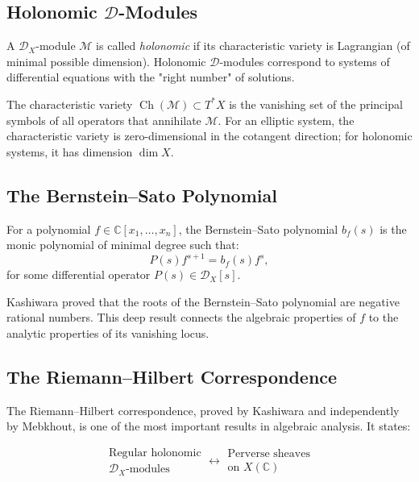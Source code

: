 \subsection{Holonomic $\mathcal{D}$-Modules}

A $\mathcal{D}_X$-module $\mathcal{M}$ is called \emph{holonomic} if its characteristic variety is Lagrangian (of minimal possible dimension). Holonomic $\mathcal{D}$-modules correspond to systems of differential equations with the "right number" of solutions.

The characteristic variety $\operatorname{Ch}(\mathcal{M}) \subset T^*X$ is the vanishing set of the principal symbols of all operators that annihilate $\mathcal{M}$. For an elliptic system, the characteristic variety is zero-dimensional in the cotangent direction; for holonomic systems, it has dimension $\dim X$.

\subsection{The Bernstein--Sato Polynomial}

For a polynomial $f \in \mathbb{C}[x_1, \ldots, x_n]$, the Bernstein--Sato polynomial $b_f(s)$ is the monic polynomial of minimal degree such that:
\[
P(s) f^{s+1} = b_f(s) f^s,
\]
for some differential operator $P(s) \in \mathcal{D}_X[s]$.

Kashiwara proved that the roots of the Bernstein--Sato polynomial are negative rational numbers. This deep result connects the algebraic properties of $f$ to the analytic properties of its vanishing locus.

\subsection{The Riemann--Hilbert Correspondence}

The Riemann--Hilbert correspondence, proved by Kashiwara and independently by Mebkhout, is one of the most important results in algebraic analysis. It states:

\[
\begin{array}{c}
\text{Regular holonomic} \\
\mathcal{D}_X\text{-modules}
\end{array}
\longleftrightarrow
\begin{array}{c}
\text{Perverse sheaves} \\
\text{on } X(\mathbb{C})
\end{array}
\]

